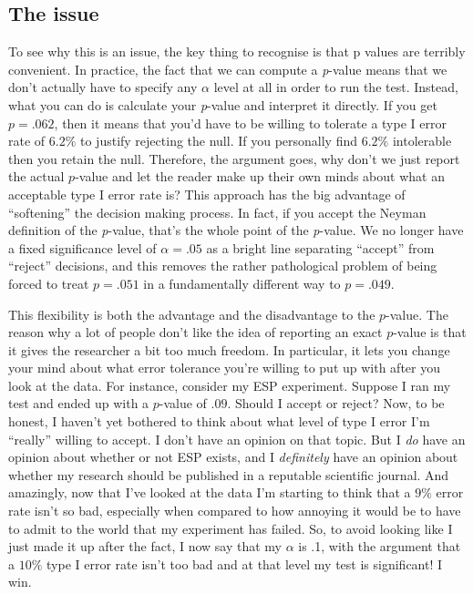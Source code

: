 \documentclass[
  a4paper,
]{book}
\begin{document}
\hypertarget{the-issue}{%
\subsection{The issue}\label{the-issue}}

To see why this is an issue, the key thing to recognise is that p values
are terribly convenient. In practice, the fact that we can compute a
\emph{p}-value means that we don't actually have to specify any
\(\alpha\) level at all in order to run the test. Instead, what you can
do is calculate your \emph{p}-value and interpret it directly. If you
get \(p = .062\), then it means that you'd have to be willing to
tolerate a type I error rate of \(6.2\%\) to justify rejecting the null.
If you personally find \(6.2\%\) intolerable then you retain the null.
Therefore, the argument goes, why don't we just report the actual
\(p\)-value and let the reader make up their own minds about what an
acceptable type I error rate is? This approach has the big advantage of
``softening'' the decision making process. In fact, if you accept the
Neyman definition of the \emph{p}-value, that's the whole point of the
\emph{p}-value. We no longer have a fixed significance level of
\(\alpha = .05\) as a bright line separating ``accept'' from ``reject''
decisions, and this removes the rather pathological problem of being
forced to treat \(p = .051\) in a fundamentally different way to
\(p = .049\).

This flexibility is both the advantage and the disadvantage to the
\(p\)-value. The reason why a lot of people don't like the idea of
reporting an exact \(p\)-value is that it gives the researcher a bit too
much freedom. In particular, it lets you change your mind about what
error tolerance you're willing to put up with after you look at the
data. For instance, consider my ESP experiment. Suppose I ran my test
and ended up with a \(p\)-value of \(.09\). Should I accept or reject?
Now, to be honest, I haven't yet bothered to think about what level of
type I error I'm ``really'' willing to accept. I don't have an opinion
on that topic. But I \emph{do} have an opinion about whether or not ESP
exists, and I \emph{definitely} have an opinion about whether my
research should be published in a reputable scientific journal. And
amazingly, now that I've looked at the data I'm starting to think that a
\(9\%\) error rate isn't so bad, especially when compared to how
annoying it would be to have to admit to the world that my experiment
has failed. So, to avoid looking like I just made it up after the fact,
I now say that my \(\alpha\) is .1, with the argument that a \(10\%\)
type I error rate isn't too bad and at that level my test is
significant! I win.
\end{document}
